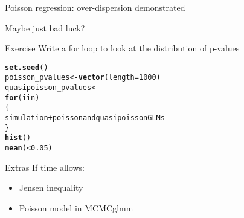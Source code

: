 \documentclass[10pt]{beamer}\usepackage[]{graphicx}\usepackage[]{color}
\makeatletter
\newcommand{\hlkwd}[1]{\textcolor[rgb]{0.737,0.353,0.396}{\textbf{#1}}}%
\newenvironment{kframe}{%
 \def\at@end@of@kframe{}%
 \ifinner\ifhmode%
  \def\at@end@of@kframe{\end{minipage}}%
  \begin{minipage}{\columnwidth}%
 \fi\fi%
 \def\FrameCommand##1{\hskip\@totalleftmargin \hskip-\fboxsep
 \colorbox{shadecolor}{##1}\hskip-\fboxsep
     \hskip-\linewidth \hskip-\@totalleftmargin \hskip\columnwidth}%
 \MakeFramed {\advance\hsize-\width
   \@totalleftmargin\z@ \linewidth\hsize
   \@setminipage}}%
 {\par\unskip\endMakeFramed%
 \at@end@of@kframe}
\newenvironment{knitrout}{}{} %
\makeatother
\begin{document}
\begin{frame}[fragile]{Poisson regression: over-dispersion demonstrated}


 Maybe just bad luck?
\begin{exampleblock}{Exercise}
  Write a for loop to look at the distribution of p-values
\end{exampleblock}

\begin{knitrout}\small
{}\color{fgcolor}\begin{kframe}
\begin{alltt}
    \hlkwd{set.seed}( )
    poisson_pvalues <- \hlkwd{vector}(length = 1000)
    quasipoisson_pvalues <-
    \hlkwd{for}(i in  )
    \{
      simulation + poisson and quasipoisson GLMs
    \}
    \hlkwd{hist}( )
    \hlkwd{mean}( <0.05)
\end{alltt}
\end{kframe}
\end{knitrout}

% 
% 
% 

\end{frame}

\begin{frame}{Extras}
  If time allows:
  \begin{itemize}
    \item Jensen inequality
    \item Poisson model in MCMCglmm
  \end{itemize}
\end{frame}
\end{document}
